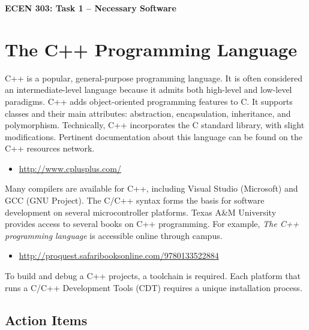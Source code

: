 \documentclass[11pt]{article}
\begin{document}
\begin{center}
{\bfseries \LARGE ECEN 303: Task 1 -- Necessary Software\\[8mm]}
\end{center}


\section{The C++ Programming Language}

C++ is a popular, general-purpose programming language.
It is often considered an intermediate-level language because it admits both high-level and low-level paradigms.
C++ adds object-oriented programming features to C.
It supports classes and their main attributes: abstraction, encapsulation, inheritance, and polymorphism.
Technically, C++ incorporates the C standard library, with slight modifications.
Pertinent documentation about this language can be found on the C++ resources network.
\begin{itemize}
\item \url{http://www.cplusplus.com/}
\end{itemize}
Many compilers are available for C++, including Visual Studio (Microsoft) and GCC (GNU Project).
The C/C++ syntax forms the basis for software development on several microcontroller platforms.
Texas A\&M University provides access to several books on C++ programming.
For example, \emph{The C++ programming language} is accessible online through campus.
\begin{itemize}
\item \url{http://proquest.safaribooksonline.com/9780133522884}
\end{itemize}
To build and debug a C++ projects, a toolchain is required.
Each platform that runs a C/C++ Development Tools (CDT) requires a unique installation process.


\subsection*{Action Items}
\end{document}
